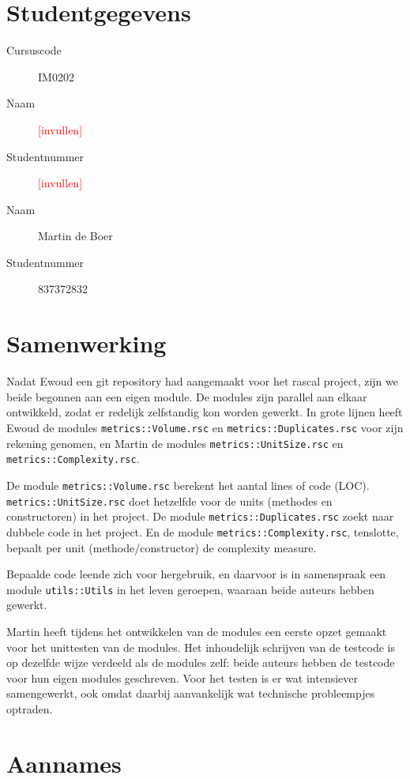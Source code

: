 \documentclass[a4paper]{article}
\newcommand{\todo}[1]{\textcolor{red}{[#1]}}
\begin{document}
\pagestyle{fancy}

\section*{Studentgegevens}
\begin{description}
	\item [Cursuscode] IM0202
	\item [Naam] \todo{invullen}
	\item [Studentnummer] \todo{invullen}
	\item [Naam] Martin de Boer
	\item [Studentnummer] 837372832
\end{description}

\section*{Samenwerking}
Nadat Ewoud een git repository had aangemaakt voor het rascal
project, zijn we beide begonnen aan een eigen module. De modules
zijn parallel aan elkaar ontwikkeld, zodat er redelijk
zelfstandig kon worden gewerkt. In grote lijnen heeft Ewoud de
modules \texttt{metrics::Volume.rsc} en
\texttt{metrics::Duplicates.rsc} voor zijn rekening genomen, en
Martin de modules \texttt{metrics::UnitSize.rsc} en
\texttt{metrics::Complexity.rsc}.

De module \texttt{metrics::Volume.rsc} berekent het aantal lines
of code (LOC). \texttt{metrics::UnitSize.rsc} doet hetzelfde
voor de units (methodes en constructoren) in het project. De
module \texttt{metrics::Duplicates.rsc} zoekt naar dubbele code
in het project. En de module \texttt{metrics::Complexity.rsc},
tenslotte, bepaalt per unit (methode/constructor) de complexity
measure.

Bepaalde code leende zich voor hergebruik, en daarvoor is in
samenspraak een module \texttt{utils::Utils} in het leven
geroepen, waaraan beide auteurs hebben gewerkt.

Martin heeft tijdens het ontwikkelen van de modules een eerste
opzet gemaakt voor het unittesten van de modules. Het
inhoudelijk schrijven van de testcode is op dezelfde wijze
verdeeld als de modules zelf: beide auteurs hebben de testcode
voor hun eigen modules geschreven. Voor het testen is er wat
intensiever samengewerkt, ook omdat daarbij aanvankelijk wat
technische probleempjes optraden.

\section{Aannames}
\end{document}
